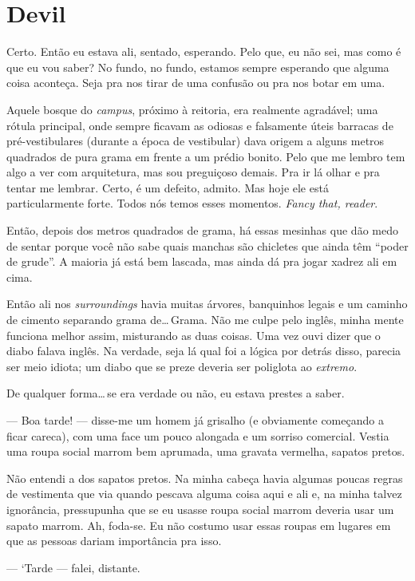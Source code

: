 \chapter{Devil}

Certo. Então eu estava ali, sentado, esperando. Pelo que, eu não sei, mas como é que eu vou saber? No fundo, no fundo, estamos sempre esperando que alguma coisa aconteça. Seja pra nos tirar de uma confusão ou pra nos botar em uma.

Aquele bosque do \emph{campus}, próximo à reitoria, era realmente agradável; uma rótula principal, onde sempre ficavam as odiosas e falsamente úteis barracas de pré-vestibulares (durante a época de vestibular) dava origem a alguns metros quadrados de pura grama em frente a um prédio bonito. Pelo que me lembro tem algo a ver com arquitetura, mas sou preguiçoso demais. Pra ir lá olhar e pra tentar me lembrar. Certo, é um defeito, admito. Mas hoje ele está particularmente forte. Todos nós temos esses momentos. \emph{Fancy that, reader}.

Então, depois dos metros quadrados de grama, há essas mesinhas que dão medo de sentar porque você não sabe quais manchas são chicletes que ainda têm ``poder de grude''. A maioria já está bem lascada, mas ainda dá pra jogar xadrez ali em cima.

Então ali nos \emph{surroundings} havia muitas árvores, banquinhos legais e um caminho de cimento separando grama de\ldots\,Grama. Não me culpe pelo inglês, minha mente funciona melhor assim, misturando as duas coisas. Uma vez ouvi dizer que o diabo falava inglês. Na verdade, seja lá qual foi a lógica por detrás disso, parecia ser meio idiota; um diabo que se preze deveria ser poliglota ao \emph{extremo}.

De qualquer forma\ldots\,se era verdade ou não, eu estava prestes a saber.

--- Boa tarde! --- disse-me um homem já grisalho (e obviamente começando a ficar careca), com uma face um pouco alongada e um sorriso comercial. Vestia uma roupa social marrom bem aprumada, uma gravata vermelha, sapatos pretos.

Não entendi a dos sapatos pretos. Na minha cabeça havia algumas poucas regras de vestimenta que via quando pescava alguma coisa aqui e ali e, na minha talvez ignorância, pressupunha que se eu usasse roupa social marrom deveria usar um sapato marrom. Ah, foda-se. Eu não costumo usar essas roupas em lugares em que as pessoas dariam importância pra isso.

--- ‘Tarde --- falei, distante.


